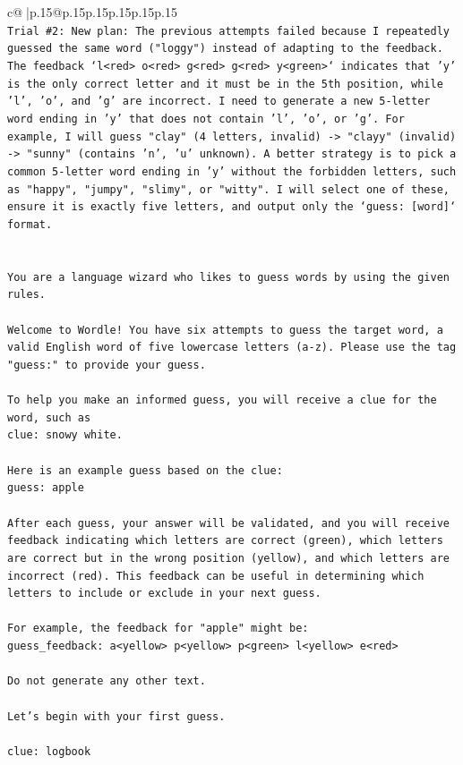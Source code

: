 \documentclass{article}
\begin{document}
{\begin{supertabular}{c@{$\;$}|p{.15\linewidth}@{}p{.15\linewidth}p{.15\linewidth}p{.15\linewidth}p{.15\linewidth}p{.15\linewidth}}
{{{\\ 
\texttt{Trial \#2: New plan: The previous attempts failed because I repeatedly guessed the same word ("loggy") instead of adapting to the feedback. The feedback `l<red> o<red> g<red> g<red> y<green>` indicates that 'y' is the only correct letter and it must be in the 5th position, while 'l', 'o', and 'g' are incorrect. I need to generate a new 5{-}letter word ending in 'y' that does not contain 'l', 'o', or 'g'. For example, I will guess "clay" (4 letters, invalid) {-}> "clayy" (invalid) {-}> "sunny" (contains 'n', 'u' unknown). A better strategy is to pick a common 5{-}letter word ending in 'y' without the forbidden letters, such as "happy", "jumpy", "slimy", or "witty". I will select one of these, ensure it is exactly five letters, and output only the `guess: {[}word{]}` format.} \\
\\ 
\\ 
\texttt{You are a language wizard who likes to guess words by using the given rules.} \\
\\ 
\texttt{Welcome to Wordle! You have six attempts to guess the target word, a valid English word of five lowercase letters (a{-}z). Please use the tag "guess:" to provide your guess.} \\
\\ 
\texttt{To help you make an informed guess, you will receive a clue for the word, such as} \\
\texttt{clue: snowy white.} \\
\\ 
\texttt{Here is an example guess based on the clue: } \\
\texttt{guess: apple} \\
\\ 
\texttt{After each guess, your answer will be validated, and you will receive feedback indicating which letters are correct (green), which letters are correct but in the wrong position (yellow), and which letters are incorrect (red). This feedback can be useful in determining which letters to include or exclude in your next guess.} \\
\\ 
\texttt{For example, the feedback for "apple" might be:} \\
\texttt{guess\_feedback: a<yellow> p<yellow> p<green> l<yellow> e<red>} \\
\\ 
\texttt{Do not generate any other text.} \\
\\ 
\texttt{Let's begin with your first guess.} \\
\\ 
\texttt{clue: logbook} \\
            }
        }
    }
     \\ \\


\end{supertabular}}
\end{document}
